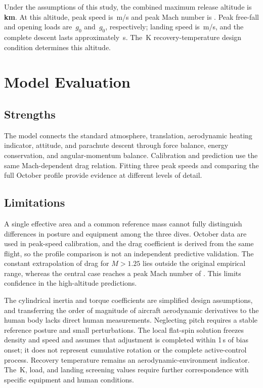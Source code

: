 \documentclass[12pt,a4paper]{article}
\numberwithin{equation}{section}
\begin{document}
Under the assumptions of this study, the combined maximum release altitude is \textbf{\MaxHeight\,km}. At this altitude, peak speed is \PeakV\,m/s and peak Mach number is \PeakMach. Peak free-fall and opening loads are \FreeG\,$g_0$ and \OpenG\,$g_0$, respectively; landing speed is \LandingV\,m/s, and the complete descent lasts approximately \TotalTime\,s. The \HeatLimit\,K recovery-temperature design condition determines this altitude.

\section{Model Evaluation}
\subsection{Strengths}
The model connects the standard atmosphere, translation, aerodynamic heating indicator, attitude, and parachute descent through force balance, energy conservation, and angular-momentum balance. Calibration and prediction use the same Mach-dependent drag relation. Fitting three peak speeds and comparing the full October profile provide evidence at different levels of detail.
\subsection{Limitations}
A single effective area and a common reference mass cannot fully distinguish differences in posture and equipment among the three dives. October data are used in peak-speed calibration, and the drag coefficient is derived from the same flight, so the profile comparison is not an independent predictive validation. The constant extrapolation of drag for $M>1.25$ lies outside the original empirical range, whereas the central case reaches a peak Mach number of \PeakMach. This limits confidence in the high-altitude predictions.

The cylindrical inertia and torque coefficients are simplified design assumptions, and transferring the order of magnitude of aircraft aerodynamic derivatives to the human body lacks direct human measurements. Neglecting pitch requires a stable reference posture and small perturbations. The local flat-spin solution freezes density and speed and assumes that adjustment is completed within 1\,s of bias onset; it does not represent cumulative rotation or the complete active-control process. Recovery temperature remains an aerodynamic-environment indicator. The \HeatLimit\,K, load, and landing screening values require further correspondence with specific equipment and human conditions.
\end{document}
